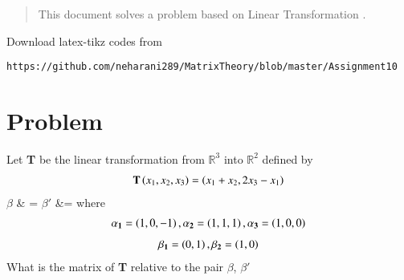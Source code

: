 \documentclass[journal,12pt,twocolumn]{IEEEtran}
\begin{document}
	
	\maketitle
	\newpage
	\bigskip
	\renewcommand{\thefigure}{\theenumi}
	\renewcommand{\thetable}{\theenumi}
	\date{Today}
\begin{abstract}
This document solves a problem based on Linear Transformation .
\end{abstract}
%
Download latex-tikz codes from 
%
\begin{lstlisting}
https://github.com/neharani289/MatrixTheory/blob/master/Assignment10
\end{lstlisting}
\section{\textbf{Problem}}
Let \textbf{T} be the linear transformation from  $\mathbb{R}^3$ into $\mathbb{R}^2$ defined by
\begin{align}
 \textbf{T} \left(x_1, x_2,x_3\right) = \left(x_1+x_2,2x_3-x_1\right)\label{T}
 \end{align}
 $\beta$ & =  
 $\beta'$ &= 
where 
\begin{align}
\mathbf{\alpha_1}  = \left(1,0,-1\right),  \mathbf{\alpha_2} = \left(1,1,1\right), \mathbf{\alpha_3} = \left(1,0,0\right)\nonumber\end{align}
\begin{align}
\mathbf{\beta_1} = \left(0,1\right), \mathbf{\beta_2} = \left(1,0\right)\nonumber
\end{align}
What is the matrix of \textbf{T} relative to the pair $\beta$, $\beta'$
\end{document}

